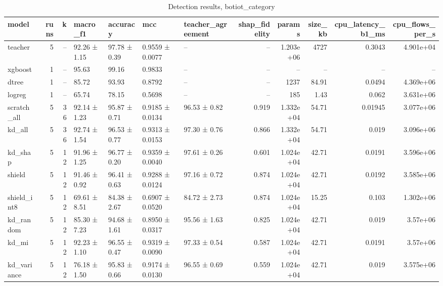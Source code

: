 \begin{table}
\caption{Detection results, botiot_category}
\begin{tabular}{lrrllllrrrrr}
\toprule
model & runs & k & macro_f1 & accuracy & mcc & teacher_agreement & shap_fidelity & params & size_kb & cpu_latency_b1_ms & cpu_flows_per_s \\
\midrule
teacher & 5 & -- & 92.26 ± 1.15 & 97.78 ± 0.39 & 0.9559 ± 0.0077 & -- & -- & 1.203e+06 & 4727 & 0.3043 & 4.901e+04 \\
xgboost & 1 & -- & 95.63 & 99.16 & 0.9833 & -- & -- & -- & -- & -- & -- \\
dtree & 1 & -- & 85.72 & 93.93 & 0.8792 & -- & -- & 1237 & 84.91 & 0.0494 & 4.369e+06 \\
logreg & 1 & -- & 65.74 & 78.15 & 0.5698 & -- & -- & 185 & 1.43 & 0.062 & 3.631e+06 \\
scratch_all & 5 & 36 & 92.14 ± 1.23 & 95.87 ± 0.71 & 0.9185 ± 0.0134 & 96.53 ± 0.82 & 0.919 & 1.332e+04 & 54.71 & 0.01945 & 3.077e+06 \\
kd_all & 5 & 36 & 92.74 ± 1.54 & 96.53 ± 0.77 & 0.9313 ± 0.0153 & 97.30 ± 0.76 & 0.866 & 1.332e+04 & 54.71 & 0.019 & 3.096e+06 \\
kd_shap & 5 & 12 & 91.96 ± 1.25 & 96.77 ± 0.20 & 0.9359 ± 0.0040 & 97.61 ± 0.26 & 0.601 & 1.024e+04 & 42.71 & 0.0191 & 3.596e+06 \\
shield & 5 & 12 & 91.46 ± 0.92 & 96.41 ± 0.63 & 0.9288 ± 0.0124 & 97.16 ± 0.72 & 0.874 & 1.024e+04 & 42.71 & 0.0192 & 3.585e+06 \\
shield_int8 & 5 & 12 & 69.61 ± 8.51 & 84.38 ± 2.67 & 0.6907 ± 0.0520 & 84.72 ± 2.73 & 0.874 & 1.024e+04 & 15.25 & 0.103 & 1.302e+06 \\
kd_random & 5 & 12 & 85.30 ± 7.23 & 94.68 ± 1.61 & 0.8950 ± 0.0317 & 95.56 ± 1.63 & 0.825 & 1.024e+04 & 42.71 & 0.019 & 3.57e+06 \\
kd_mi & 5 & 12 & 92.23 ± 1.10 & 96.55 ± 0.47 & 0.9319 ± 0.0090 & 97.33 ± 0.54 & 0.587 & 1.024e+04 & 42.71 & 0.0191 & 3.57e+06 \\
kd_variance & 5 & 12 & 76.18 ± 1.50 & 95.83 ± 0.66 & 0.9174 ± 0.0130 & 96.55 ± 0.69 & 0.559 & 1.024e+04 & 42.71 & 0.019 & 3.575e+06 \\
\bottomrule
\end{tabular}
\end{table}
